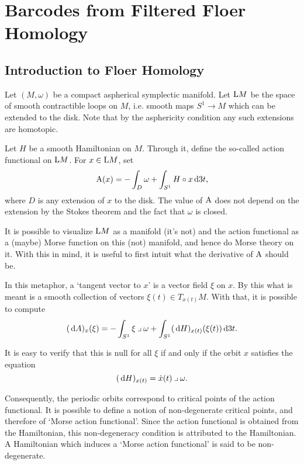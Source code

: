 
\section{Barcodes from Filtered Floer Homology}

\subsection{Introduction to Floer Homology}

Let $(M, \omega)$ be a compact aspherical symplectic manifold. Let $\LL M$ be the space of smooth contractible loops on $M$, i.e. smooth maps $S^1 \to M$ which can be extended to the disk. Note that by the asphericity condition any such extensions are homotopic.

Let $H$ be a smooth Hamiltonian on $M$. Through it, define the so-called action functional on $\LL M$. For $x \in \LL M$, set
\begin{equation}
\AA(x) = - \int_D \omega + \int_{S^1} H \circ x \dl3 t,
\end{equation}
where $D$ is any extension of $x$ to the disk. The value of $\AA$ does not depend on the extension by the Stokes theorem and the fact that $\omega$ is closed.

It is possible to visualize $\LL M$ as a manifold (it's not) and the action functional as a (maybe) Morse function on this (not) manifold, and hence do Morse theory on it. With this in mind, it is useful to first intuit what the derivative of $\AA$ should be.

In this metaphor, a `tangent vector to $x$' is a vector field $\xi$ on $x$. By this what is meant is a smooth collection of vectors $\xi(t) \in T_{x(t)} M$. With that, it is possible to compute
\begin{equation}
 (\dl A)_x(\xi) = - \int_{S^1} \xi \into \omega + \int_{S^1} (\dl H)_{x(t)} (\xi(t)) \dl3t. 
\end{equation}

It is easy to verify that this is null for all $\xi$ if and only if the orbit $x$ satisfies the equation
\begin{equation}
(\dl H)_{x(t)} = \dot x(t) \into \omega.
\end{equation}

Consequently, the periodic orbits correspond to critical points of the action functional. It is possible to define a notion of non-degenerate critical points, and therefore of `Morse action functional'. Since the action functional is obtained from the Hamiltonian, this non-degeneracy condition is attributed to the Hamiltonian. A Hamiltonian which induces a `Morse action functional' is said to be non-degenerate.

